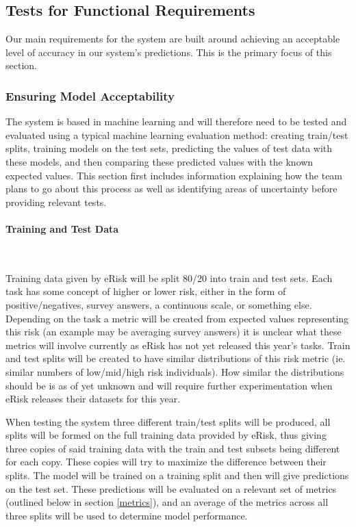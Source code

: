 \documentclass[12pt, titlepage]{article}
\newcommand{\myparagraph}[1]{\paragraph{#1}\mbox{}\\}
\begin{document}
\subsection{Tests for Functional Requirements}

Our main requirements for the system are built around achieving an acceptable level of accuracy in our system's predictions. This is the primary focus of this section.

\subsubsection{Ensuring Model Acceptability}

The system is based in machine learning and will therefore need to be tested and evaluated using a typical machine learning evaluation method: creating train/test splits, training models on the test sets, predicting the values of test data with these models, and then comparing these predicted values with the known expected values. This section first includes information explaining how the team plans to go about this process as well as identifying areas of uncertainty before providing relevant tests.

\myparagraph{Training and Test Data} \label{TTD}

Training data given by eRisk will be split 80/20 into train and test sets. Each task has some concept of higher or lower risk, either in the form of positive/negatives, survey answers, a continuous scale, or something else. Depending on the task a metric will be created from expected values representing this risk (an example may be averaging survey answers) it is unclear what these metrics will involve currently as eRisk has not yet released this year’s tasks. Train and test splits will be created to have similar distributions of this risk metric (ie. similar numbers of low/mid/high risk individuals). How similar the distributions should be is as of yet unknown and will require further experimentation when eRisk releases their datasets for this year.

When testing the system three different train/test splits will be produced, all splits will be formed on the full training data provided by eRisk, thus giving three copies of said training data with the train and test subsets being different for each copy. These copies will try to maximize the difference between their splits. The model will be trained on a training split and then will give predictions on the test set. These predictions will be evaluated on a relevant set of metrics (outlined below in section \ref{metrics}), and an average of the metrics across all three splits will be used to determine model performance.
\end{document}
